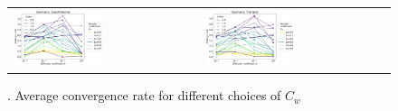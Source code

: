 \begin{example}
\begin{figure}[h!]
    \centering
    \begin{tabular}{p{} p{}}
        \vspace{0pt}
        \includegraphics[width=0.5\textwidth]{../figs/parametric/advdiff_2D/ord_quarteroni3_2_4}
        &
        \vspace{0pt}
        \includegraphics[width=0.5\textwidth]{../figs/parametric/advdiff_2D/ord_quarteroni3_2_3}
    \end{tabular}
    \caption{. Average convergence rate for different choices of $C_w$}
    \label{fig:orders_quarteroni3}
\end{figure}
\end{example}


